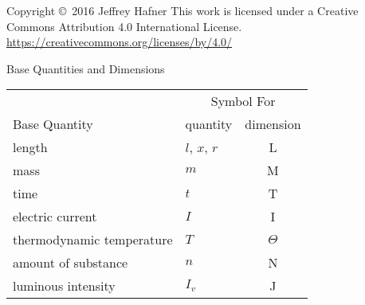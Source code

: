 \documentclass[avery5371,grid]{flashcards}
\begin{document}


\begin{flashcard}{Copyright \copyright \, 2016 Jeffrey Hafner}
\vspace{\fill}
This work is licensed under a Creative Commons Attribution 4.0 International License.
\vspace{\fill}
\flushright
\small\url{https://creativecommons.org/licenses/by/4.0/}
\end{flashcard}


\begin{flashcard}[Definitions]{Base Quantities and Dimensions}
\vspace{\fill}\small
\begin{center}
\begin{tabular}{llc}
    \toprule
                  & \multicolumn{2}{c}{Symbol For} \\
    Base Quantity & quantity & dimension \\
    \midrule
    length  & $l$, $x$, $r$              & L \\
    mass    & $m$                        & M \\
    time    & $t$                        & T \\
    electric current            & $I$    & I \\
    thermodynamic temperature   & $T$    & $\Theta$ \\
    amount of substance         & $n$    & N \\
    luminous intensity          & $I_v$  & J \\
    \bottomrule
\end{tabular}
\end{center}
\vspace{\fill}
\end{flashcard}
\end{document}
